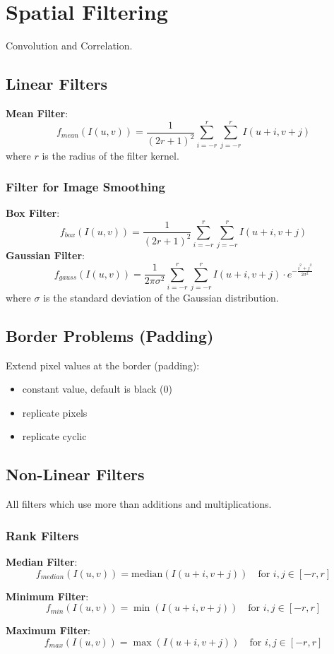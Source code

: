 \section{Spatial Filtering}
Convolution and Correlation.
\subsection{Linear Filters}
\textbf{Mean Filter}:
\[
f_{mean}(I(u, v)) = \frac{1}{(2r+1)^2} \sum_{i=-r}^{r} \sum_{j=-r}^{r} I(u+i, v+j)
\]
where \(r\) is the radius of the filter kernel.
\subsubsection{Filter for Image Smoothing}
\textbf{Box Filter}:
\[
f_{box}(I(u, v)) = \frac{1}{(2r+1)^2} \sum_{i=-r}^{r} \sum_{j=-r}^{r} I(u+i, v+j)
\]
\textbf{Gaussian Filter}:
\[
f_{gauss}(I(u, v)) = \frac{1}{2\pi\sigma^2} \sum_{i=-r}^{r} \sum_{j=-r}^{r} I(u+i, v+j) \cdot e^{-\frac{i^2 + j^2}{2\sigma^2}}
\]
where \(\sigma\) is the standard deviation of the Gaussian distribution.

\subsection{Border Problems (Padding)}
Extend pixel values at the border (padding):
\begin{itemize}
    \item constant value, default is black (0)
    \item replicate pixels
    \item replicate cyclic 
\end{itemize}
\subsection{Non-Linear Filters}
All filters which use more than additions and multiplications.
\subsubsection{Rank Filters}
\textbf{Median Filter}:
\[
f_{median}(I(u, v)) = \text{median} \left( I(u+i, v+j) \right) \quad \text{for } i,j \in [-r,r]
\]

\textbf{Minimum Filter}:
\[
f_{min}(I(u, v)) = \min \left( I(u+i, v+j) \right) \quad \text{for } i,j \in [-r,r]
\]

\textbf{Maximum Filter}:
\[
f_{max}(I(u, v)) = \max \left( I(u+i, v+j) \right) \quad \text{for } i,j \in [-r,r] 
\]
